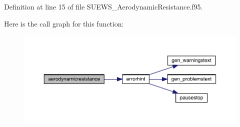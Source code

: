 Definition at line 15 of file S\+U\+E\+W\+S\+\_\+\+Aerodynamic\+Resistance.\+f95.

Here is the call graph for this function\+:\nopagebreak
\begin{figure}[H]
\begin{center}
\leavevmode
\includegraphics[width=350pt]{_s_u_e_w_s___aerodynamic_resistance_8f95_a04f1fea7666166223b4895686e96bcbf_cgraph}
\end{center}
\end{figure}
